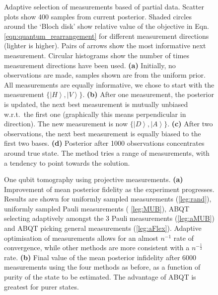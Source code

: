\begin{figure}
	\caption[Illustration of adaptive tomography on a single-photon system]{Adaptive selection of measurements based of partial data. Scatter plots show 400 samples from current posterior. Shaded circles around the `Bloch disk' show relative value of the objective in Eqn.\,\eqref{eqn:quantum_rearrangement} for different measurement directions (lighter is higher). Pairs of arrows show the most informative next measurement. Circular histograms show the number of times measurement directions have been used. \textbf{(a)}  Initially, no observations are made, samples shown are from the uniform prior. All measurements are equally informative, we chose to start with the measurement $\{\left\vert H\right\rangle,\left\vert V\right\rangle\}$. \textbf{(b)}  After one measurement, the posterior is updated, the next best measurement is mutually unbiased w.r.t.\ the first one (graphically this means perpendicular in direction). The new measurement is now $\{\left\vert D\right\rangle,\left\vert A\right\rangle\}$. \textbf{(c)} After two observations, the next best measurement is equally biased to the first two bases. \textbf{(d)} Posterior after 1000 observations concentrates around true state. The method tries a range of measurements, with a tendency to point towards the solution.
	\label{fig:Bloch_disk}}
\end{figure}

\begin{figure}
	\caption[Single-qubit adaptive tomography using projective measurements.]{One qubit tomography using projective measurements. \textbf{(a)}  Improvement of mean posterior fidelity as the experiment progresses. Results are shown for uniformly sampled measurements (\ref{leg:rand}), uniformly sampled Pauli measurements ( \ref{leg:MUB}), ABQT selecting adaptively amongst the 3 Pauli measurements (\ref{leg:aMUB}) and ABQT picking general measurements (\ref{leg:aFlex}). Adaptive optimisation of measurements allows for an almost $n^{-1}$ rate of convergence, while other methods are more consistent with a $n^{-\frac{1}{2}}$ rate. \textbf{(b)}  Final value of the mean posterior infidelity after 6000 measurements using the four methods as before, as a function of purity of the state to be estimated. The advantage of ABQT is greatest for purer states. \label{fig:qubit_results}}
\end{figure}

